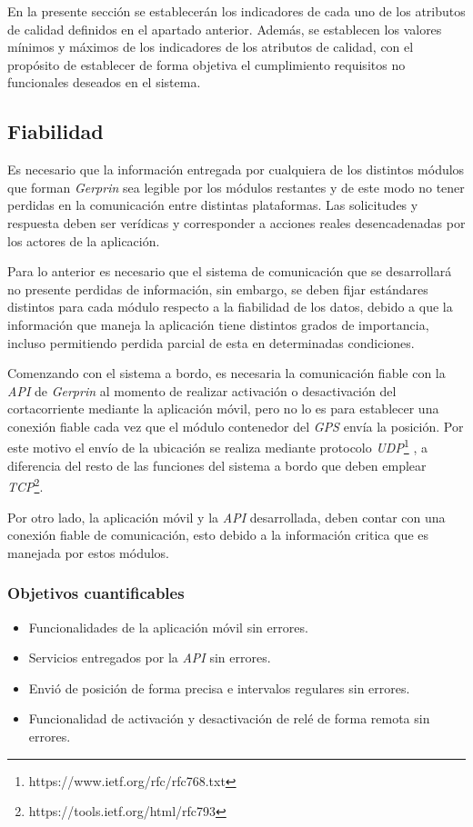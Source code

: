 En la presente sección se establecerán los indicadores de cada uno de los atributos de calidad definidos en el apartado anterior. Además, se establecen los valores mínimos y máximos de los indicadores de los atributos de calidad, con el propósito de establecer de forma objetiva el cumplimiento requisitos no funcionales deseados en el sistema.

\subsection{Fiabilidad}

Es necesario que la información entregada por cualquiera de los distintos módulos que forman \emph{Gerprin} sea legible por los módulos restantes y de este modo no tener perdidas en la comunicación entre distintas plataformas. Las solicitudes y respuesta deben ser verídicas y corresponder a acciones reales desencadenadas por los actores de la aplicación.

Para lo anterior es necesario que el sistema de comunicación que se desarrollará no presente perdidas de información, sin embargo, se deben fijar estándares distintos para cada módulo respecto a la fiabilidad de los datos, debido a que la información que maneja la aplicación tiene distintos grados de importancia, incluso permitiendo perdida parcial de esta en determinadas condiciones.

Comenzando con el sistema a bordo, es necesaria la comunicación fiable con la \emph{API} de \emph{Gerprin} al momento de realizar activación o desactivación del cortacorriente mediante la aplicación móvil, pero no lo es para establecer una conexión fiable cada vez que el módulo contenedor del \emph{GPS} envía la posición. Por este motivo el envío de la ubicación se realiza mediante protocolo \emph{UDP}\footnote{https://www.ietf.org/rfc/rfc768.txt} , a diferencia del resto de las funciones del sistema a bordo que deben emplear \emph{TCP}\footnote{https://tools.ietf.org/html/rfc793}.

Por otro lado, la aplicación móvil y la \emph{API} desarrollada, deben contar con una conexión fiable de comunicación, esto debido a la información critica que es manejada por estos módulos.

\subsubsection{Objetivos cuantificables}

\begin{itemize}
	\item
	Funcionalidades de la aplicación móvil sin errores.
	\item
	Servicios entregados por la \emph{API} sin errores.
	\item
	Envió de posición de forma precisa e intervalos regulares sin errores.
	\item
	Funcionalidad de activación y desactivación de relé de forma remota sin errores.
\end{itemize}

